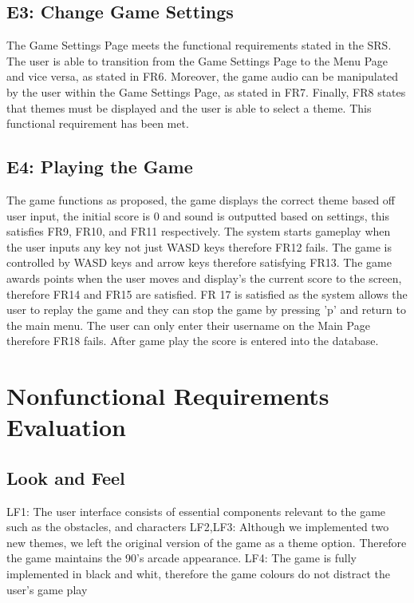 \documentclass[12pt, titlepage]{article}
\begin{document}
	
	\subsection{E3: Change Game Settings}
	The Game Settings Page meets the functional requirements stated in the SRS. The user is able to transition from the Game Settings Page to the Menu Page and vice versa, as stated in FR6. Moreover, the game audio can be manipulated by the user within the Game Settings Page, as stated in FR7. Finally, FR8 states that themes must be displayed and the user is able to select a theme. This functional requirement has been met.
	
	\subsection{E4: Playing the Game}
	The game functions as proposed, the game displays the correct theme based off user input, the initial score is 0 and sound is outputted based on settings, this satisfies FR9, FR10, and FR11 respectively. The system starts gameplay when the user inputs any key not just WASD keys therefore FR12 fails. The game is controlled by WASD keys and arrow keys therefore satisfying FR13. The game awards points when the user moves and display's the current score to the screen, therefore FR14 and FR15 are satisfied. FR 17 is satisfied as the system allows the user to replay the game and they can stop the game by pressing 'p' and return to the main menu. The user can only enter their username on the Main Page therefore FR18 fails. After game play the score is entered into the database. 
	
	
	\section{Nonfunctional Requirements Evaluation}
	\subsection{Look and Feel}	
	LF1: The user interface consists of essential components relevant to the game such as the obstacles, and characters
	LF2,LF3: Although we implemented two new themes, we left the original version of the game as a theme option. Therefore the game maintains the 90's arcade appearance.
	LF4: The game is fully implemented in black and whit, therefore the  game colours do not distract the user's game play
	
\end{document}
